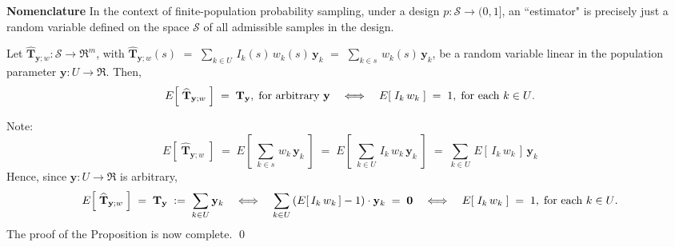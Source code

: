 \documentclass{article}
\begin{document}
\noindent
\textbf{Nomenclature}
\;
In the context of finite-population probability sampling, under a design
$p : \mathcal{S} \longrightarrow (0,1]$,
an ``estimator" is precisely just a random variable defined on the space
$\mathcal{S}$ of all admissible samples in the design.

\begin{proposition}
\label{proposition:Unbiasedness}
\mbox{}
\vskip 0.2cm
\noindent
Let $\widehat{\mathbf{T}}_{\mathbf{y};w} : \mathcal{S} \longrightarrow \Re^{m}$, with
$\widehat{\mathbf{T}}_{\mathbf{y};w}(s)$
$=$ $\underset{k \in U}{\sum}\,I_{k}(s)\,w_{k}(s)\,\mathbf{y}_{k}$
$=$ $\underset{k \in s}{\sum}\,w_{k}(s)\,\mathbf{y}_{k}$,
be a random variable linear in the population parameter
$\mathbf{y} : U \longrightarrow \Re$.
Then,
\begin{equation*}
E\!\left[\;\widehat{\mathbf{T}}_{\mathbf{y};w}\;\right] \; = \; \mathbf{T}_{\mathbf{y}},\;\textnormal{for arbitrary $\mathbf{y}$}
\quad\Longleftrightarrow\quad
E\!\left[\;I_{k}\,w_{k}\;\right] \; = \; 1,\;\textnormal{for each $k \in U$}.
\end{equation*}
\end{proposition}
\proof
Note:
\begin{equation*}
E\!\left[\;\widehat{\mathbf{T}}_{\mathbf{y};w}\;\right]
\;=\; E\!\left[\;\underset{k \in s}{\sum}\,w_{k}\,\mathbf{y}_{k}\;\right]
\;=\; E\!\left[\;\underset{k \in U}{\sum}\,I_{k}\,w_{k}\,\mathbf{y}_{k}\;\right]
\;=\; \underset{k \in U}{\sum}\,E\!\left[\,I_{k}\,w_{k}\,\right]\,\mathbf{y}_{k}
\end{equation*}
Hence, since $\mathbf{y} : U \longrightarrow \Re$ is arbitrary,
\begin{equation*}
E\!\left[\;\widehat{\mathbf{T}}_{\mathbf{y};w}\;\right] \;=\; \mathbf{T}_{\mathbf{y}} \; := \; \underset{k \in U}{\sum}\,\mathbf{y}_{k}
\quad\Longleftrightarrow\quad
\sum_{k \in U}\left(E\!\left[\,I_{k}\,w_{k}\,\right]-1\right)\cdot\mathbf{y}_{k} \; = \; \mathbf{0}
\quad\Longleftrightarrow\quad
E\!\left[\;I_{k}\,w_{k}\;\right] \; = \; 1,\;\textnormal{for each $k \in U$}.
\end{equation*}
The proof of the Proposition is now complete. \qed
\end{document}
